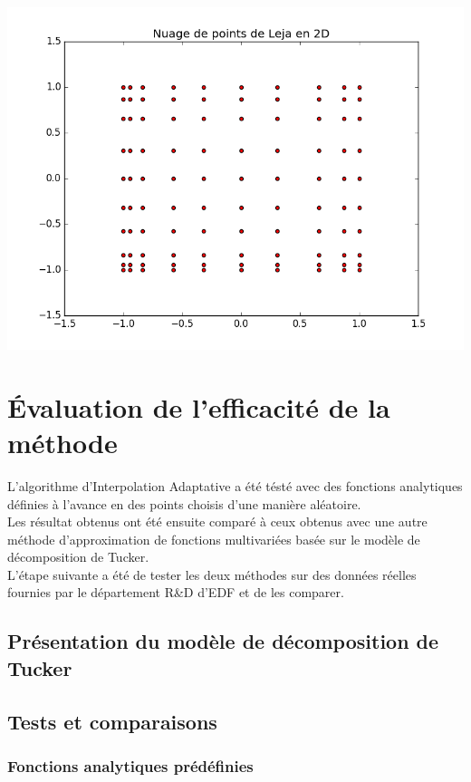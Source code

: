 \begin{center}
\includegraphics[height= 9 cm,width = \linewidth]{images/leja_sequence.png}
\end{center}

\section{Évaluation de l’efficacité de la méthode}\label{sec:6}
L'algorithme d'Interpolation Adaptative a été tésté avec des fonctions analytiques définies à l'avance en des points choisis d'une manière aléatoire.\\
Les résultat obtenus ont été ensuite comparé à ceux obtenus avec une autre méthode d'approximation de fonctions multivariées basée sur
le modèle de décomposition de Tucker.\\
L'étape suivante a été de tester les deux méthodes sur des données réelles fournies par le département R\&D d'EDF et de les comparer.

\subsection{Présentation du modèle de décomposition de Tucker}
\subsection{Tests et comparaisons}
\subsubsection{Fonctions analytiques prédéfinies}

